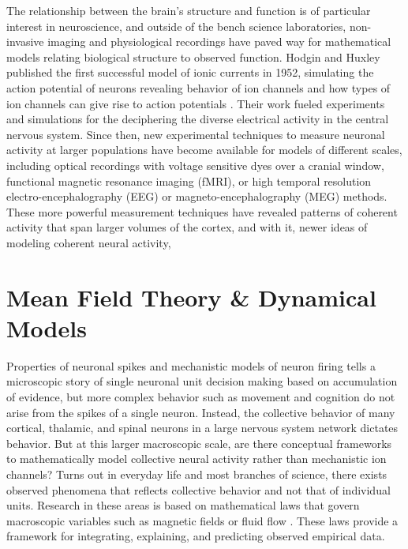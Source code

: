 The relationship between the brain's structure and function is of particular interest in neuroscience, and outside of the bench science laboratories, non-invasive imaging and physiological recordings have paved way for mathematical models relating biological structure to observed function. Hodgin and Huxley published the first successful model of ionic currents in 1952, simulating the action potential of neurons revealing behavior of ion channels and how types of ion channels can give rise to action potentials \cite{hodgkin_quantitative_1952}. Their work fueled experiments and simulations for the deciphering the diverse electrical activity in the central nervous system. Since then, new experimental techniques to measure neuronal activity at larger populations have become available for models of different scales, including optical recordings with voltage sensitive dyes over a cranial window, functional magnetic resonance imaging (fMRI), or high temporal resolution electro-encephalography (EEG) or magneto-encephalography (MEG) methods. These more powerful measurement techniques have revealed patterns of coherent activity that span larger volumes of the cortex, and with it, newer ideas of modeling coherent neural activity,



\section{Mean Field Theory \& Dynamical Models}
Properties of neuronal spikes and mechanistic models of neuron firing tells a microscopic story of single neuronal unit decision making based on accumulation of evidence, but more complex behavior such as movement and cognition do not arise from the spikes of a single neuron. Instead, the collective behavior of many cortical, thalamic, and spinal neurons in a large nervous system network dictates behavior. But at this larger macroscopic scale, are there conceptual frameworks to mathematically model collective neural activity rather than mechanistic ion channels? Turns out in everyday life and most branches of science, there exists observed phenomena that reflects collective behavior and not that of individual units. Research in these areas is based on mathematical laws that govern macroscopic variables such as magnetic fields or fluid flow \cite{haken_introduction_2004,fiedler_coherent_1987}. These laws provide a framework for integrating, explaining, and predicting observed empirical data.

